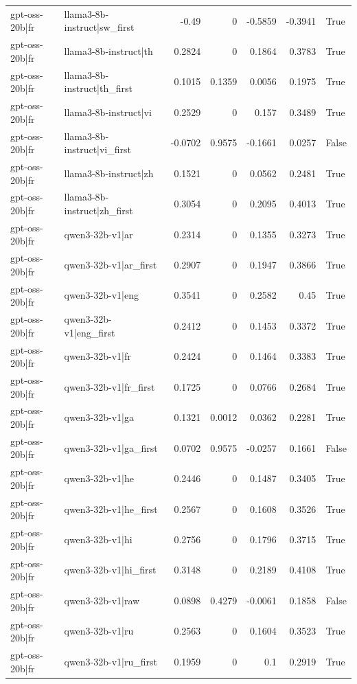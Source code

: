 \begin{table}
\begin{tabular}{l l r r r r l}
gpt-oss-20b|fr & llama3-8b-instruct|sw_first & -0.49 & 0 & -0.5859 & -0.3941 & True \\
gpt-oss-20b|fr & llama3-8b-instruct|th & 0.2824 & 0 & 0.1864 & 0.3783 & True \\
gpt-oss-20b|fr & llama3-8b-instruct|th_first & 0.1015 & 0.1359 & 0.0056 & 0.1975 & True \\
gpt-oss-20b|fr & llama3-8b-instruct|vi & 0.2529 & 0 & 0.157 & 0.3489 & True \\
gpt-oss-20b|fr & llama3-8b-instruct|vi_first & -0.0702 & 0.9575 & -0.1661 & 0.0257 & False \\
gpt-oss-20b|fr & llama3-8b-instruct|zh & 0.1521 & 0 & 0.0562 & 0.2481 & True \\
gpt-oss-20b|fr & llama3-8b-instruct|zh_first & 0.3054 & 0 & 0.2095 & 0.4013 & True \\
gpt-oss-20b|fr & qwen3-32b-v1|ar & 0.2314 & 0 & 0.1355 & 0.3273 & True \\
gpt-oss-20b|fr & qwen3-32b-v1|ar_first & 0.2907 & 0 & 0.1947 & 0.3866 & True \\
gpt-oss-20b|fr & qwen3-32b-v1|eng & 0.3541 & 0 & 0.2582 & 0.45 & True \\
gpt-oss-20b|fr & qwen3-32b-v1|eng_first & 0.2412 & 0 & 0.1453 & 0.3372 & True \\
gpt-oss-20b|fr & qwen3-32b-v1|fr & 0.2424 & 0 & 0.1464 & 0.3383 & True \\
gpt-oss-20b|fr & qwen3-32b-v1|fr_first & 0.1725 & 0 & 0.0766 & 0.2684 & True \\
gpt-oss-20b|fr & qwen3-32b-v1|ga & 0.1321 & 0.0012 & 0.0362 & 0.2281 & True \\
gpt-oss-20b|fr & qwen3-32b-v1|ga_first & 0.0702 & 0.9575 & -0.0257 & 0.1661 & False \\
gpt-oss-20b|fr & qwen3-32b-v1|he & 0.2446 & 0 & 0.1487 & 0.3405 & True \\
gpt-oss-20b|fr & qwen3-32b-v1|he_first & 0.2567 & 0 & 0.1608 & 0.3526 & True \\
gpt-oss-20b|fr & qwen3-32b-v1|hi & 0.2756 & 0 & 0.1796 & 0.3715 & True \\
gpt-oss-20b|fr & qwen3-32b-v1|hi_first & 0.3148 & 0 & 0.2189 & 0.4108 & True \\
gpt-oss-20b|fr & qwen3-32b-v1|raw & 0.0898 & 0.4279 & -0.0061 & 0.1858 & False \\
gpt-oss-20b|fr & qwen3-32b-v1|ru & 0.2563 & 0 & 0.1604 & 0.3523 & True \\
gpt-oss-20b|fr & qwen3-32b-v1|ru_first & 0.1959 & 0 & 0.1 & 0.2919 & True \\

\end{tabular}
\end{table}
